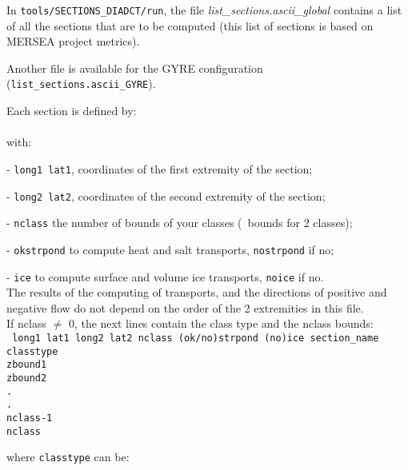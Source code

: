 \documentclass[../main/NEMO_manual]{subfiles}
\begin{document}
In \texttt{tools/SECTIONS\_DIADCT/run},
the file \textit{ {list\_sections.ascii\_global}} contains a list of all the sections that are to be computed
(this list of sections is based on MERSEA project metrics).

Another file is available for the GYRE configuration (\texttt{ {list\_sections.ascii\_GYRE}}).

Each section is defined by: \\
 \\
with:

 - \texttt{long1 lat1}, coordinates of the  first extremity of the section;

 - \texttt{long2 lat2}, coordinates of the second extremity of the section;

 - \texttt{nclass}    the number of bounds of your classes (\eg\ bounds for 2 classes);

 - \texttt{okstrpond} to compute    heat and       salt transports, \texttt{nostrpond} if no;

 - \texttt{ice}       to compute surface and volume ice transports, \texttt{noice}     if no. \\

 \noindent The results of the computing of transports, and the directions of positive and
 negative flow do not depend on the order of the 2 extremities in this file. \\

\noindent If nclass $\neq$ 0, the next lines contain the class type and the nclass bounds: \\
{
  \texttt{
    long1 lat1 long2 lat2 nclass (ok/no)strpond (no)ice section\_name \\
    classtype                                                         \\
    zbound1                                                           \\
    zbound2                                                           \\
    .                                                                 \\
    .                                                                 \\
    nclass-1                                                          \\
    nclass}
}

\noindent where \texttt{classtype} can be:
\end{document}
